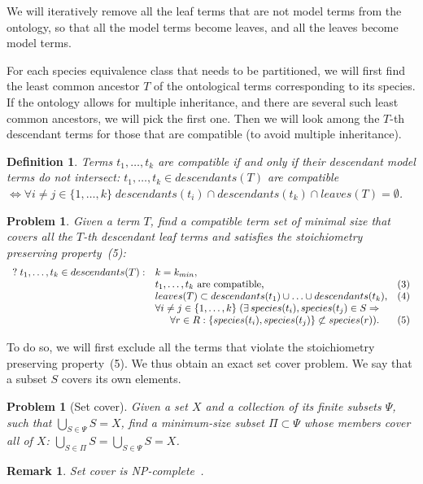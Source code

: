 \documentclass[10pt]{bmc_article}
\newenvironment{bmcformat}{\baselineskip20pt\sloppy\setboolean{publ}{false}}{\baselineskip20pt\sloppy}
\begin{document}
\begin{bmcformat}
We will iteratively remove all the leaf terms that are not model terms from the ontology, so that all the model terms become leaves, and all the leaves become model terms. 

For each species equivalence class that needs to be partitioned, we will first find the least common ancestor $T$ of the ontological terms corresponding to its species. If the ontology allows for multiple inheritance, and there are several such least common ancestors, we will pick the first one. Then we will look among the $T$-th descendant terms for those that are compatible (to avoid multiple inheritance).

\newtheorem{comp}[def]{Definition}
\begin{comp}
Terms $ t_1, \ldots, t_k$ are \emph{compatible} if and only if their descendant model terms do not intersect:
$ t_1, \ldots, t_k \in descendants(T)$ are compatible $\iff \forall i \neq j \in \{1, \ldots, k\} \; descendants(t_i) \cap descendants(t_k) \cap leaves(T) = \emptyset$.
\end{comp}

\newtheorem{pp}[pbm]{Problem}
\begin{pp}
Given a term $T$, find a compatible term set of minimal size that covers all the $T$-th descendant leaf terms and satisfies the stoichiometry preserving property~(5):
\[ \begin{array}{lllr}
\mbox{$?\; t_1, \ldots, t_k \in descendants(T):$} & \mbox{$k = k_{min}$},&\\
& \mbox{$t_1, \ldots, t_k$ are compatible,} & (3)\\
& \mbox{$leaves(T) \subset descendants(t_1) \cup \ldots \cup descendants(t_k)$},  & (4)\\
& \mbox{$\forall i \neq j \in \{1, \ldots, k\}\; (\exists\, species(t_i), species(t_j) \in S \Rightarrow$} & \\
& \indent \mbox{$\forall r \in R: \{species(t_i), species(t_j)\} \not \subset species(r))$}. & (5)
\end{array} \]

\end{pp}
To do so, we will first exclude all the terms that violate the stoichiometry preserving property~(5). We thus obtain an exact set cover problem. We say that a subset $S$ covers its own elements.

\newtheorem{setc}[pbm]{Problem}
\begin{setc}[Set cover]
Given a set $X$ and a collection of its finite subsets $\Psi$, such that $\bigcup_{S \in \Psi} S = X$, find a minimum-size subset $\Pi \subset \Psi$ whose members cover all of $X$: $\bigcup_{S \in \Pi} S = \bigcup_{S \in \Psi} S = X$.
\end{setc}
\newtheorem{rem}[rm]{Remark}
\begin{rem}
 Set cover is \textit{NP}-complete~\cite{karp72}.
\end{rem}


\end{bmcformat}
\end{document}
